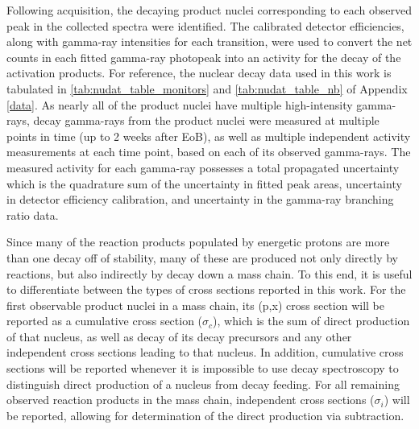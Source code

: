 \documentclass[3p]{elsarticle}
\begin{document}
Following  acquisition, the decaying product nuclei corresponding to each observed peak in the collected spectra were identified.
The calibrated detector efficiencies, along with gamma-ray intensities for each transition, were used to convert the net  counts in each fitted gamma-ray photopeak into an activity for the decay of the activation products.  
For reference, the nuclear decay data used in this work is tabulated in \autoref{tab:nudat_table_monitors} and \autoref{tab:nudat_table_nb} of Appendix \ref{data}.
As nearly all of the product nuclei have multiple high-intensity gamma-rays, decay gamma-rays from the product nuclei were measured at multiple points in time (up to 2 weeks after EoB), as well as multiple independent activity measurements at each time point, based on each of its observed gamma-rays.
The measured activity for each gamma-ray possesses a total propagated uncertainty which is the quadrature sum of the uncertainty in  fitted peak areas, uncertainty in detector efficiency calibration, and uncertainty in the gamma-ray branching ratio data.






Since many of the reaction products populated by energetic protons are more than one decay off of stability, many of these are produced not only  directly by reactions, but also indirectly by decay down a mass chain.
To this end, it is useful to differentiate between the types of cross sections reported in this work. 
For the first observable product nuclei in a mass chain, its (p,x) cross section will be reported as a cumulative cross section ($\sigma_c$), which is the sum of direct production of that nucleus, as well as decay of its decay precursors and any other independent cross sections leading to that nucleus. 
In addition, cumulative cross sections will be reported whenever it is impossible to use decay spectroscopy to distinguish direct production of a nucleus from decay feeding.
For all remaining observed reaction products in the mass chain, independent cross sections ($\sigma_i$) will be reported, allowing for determination of the direct production via subtraction.  
\end{document}
